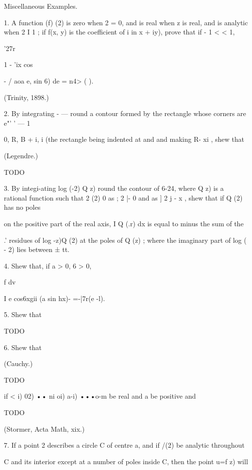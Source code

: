 %
%

Miscellaneous Examples.

1. A function (f) (2) is zero when 2 = 0, and is real when z is real,
and is analytic when 2 I 1 ; if f(x, y) is the coefficient of i in x +
iy), prove that if - 1 < < 1,



'27r



1 - 'ix cos



  - / aoa e, sin 6) de = n4> ( ).



(Trinity, 1898.)



2. By integrating - — round a contour formed by the rectangle whose
corners are e"' ' — 1



0, R, B + i, i (the rectangle being indented at and and making R- xi ,
shew that

(Legendre.)

TODO

3. By integi-ating log (-2) Q z) round the contour of 6-24, where Q z)
is a rational function such that 2 (2) 0 as ; 2 |- 0 and as ] 2 j - x
, shew that if Q (2) has no poles

on the positive part of the real axis, I Q (.r) dx is equal to minus
the sum of the

.' residues of log -z)Q (2) at the poles of Q (z) ; where the
imaginary part of log ( - 2) lies between ± tt.

4. Shew that, if a > 0, 6 > 0,



f dv

I e cos6xgii (a sin hx)- =-|7r(e -l).



5. Shew that

TODO

6. Shew that

(Cauchy.)

TODO

if < i) 02) •• ni oi) a-i) •••o-m be real and a be positive and

TODO

(Stormer, Acta Math, xix.)

7. If a point 2 describes a circle C of centre a, and if /(2) be
analytic throughout

C and its interior except at a number of poles inside C, then the
point u=f z) will

